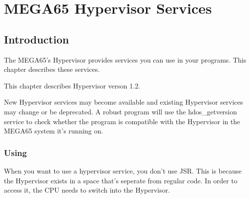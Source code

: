 \newenvironment{hyppotrap}[3]
{
  \newcommand{\availablefrom}[1]{Available starting with Hypervisor ##1}
  \newcommand{\errordesc}[3]{\textbf{\$##1 ##2} ##3\par}
  \newcommand{\notimplemented}{\item[Remarks:]\textbf{NOT IMPLEMENTED}\par}
  \newcommand{\register}[2]{\textbf{##1} ##2\par}
  \newcommand{\TODO}{\textbf{\color{red}TODO}}
  \titleformat*{\subsection}{\normalfont\huge\bfseries\color{blue}}
  \subsection{hdos\_#1}
  \index{Hypervisor Services!\$#2 \$#3}
  \begin{description}[leftmargin=2.7cm,style=nextline]
  \item [Trap:] LDA \#\$#3 : STA \$#2 : CLV
}
{
  \end{description}
}

\chapter{MEGA65 Hypervisor Services}

\section{Introduction}
The MEGA65's Hypervisor provides services you can use in your programs. This
chapter describes these services.

This chapter describes Hypervisor verson 1.2.

New Hypervisor services may become available and existing Hypervisor services
may change or be deprecated. A robust program will use the hdos\_getversion
service to check whether the program is compatible with the Hypervisor in the
MEGA65 system it's running on.


\subsection{Using}
When you want to use a hypervisor service, you don't use JSR. This is because
the Hypervisor exists in a space that's seperate from regular code. In order to
access it, the CPU needs to switch into the Hypervisor.

